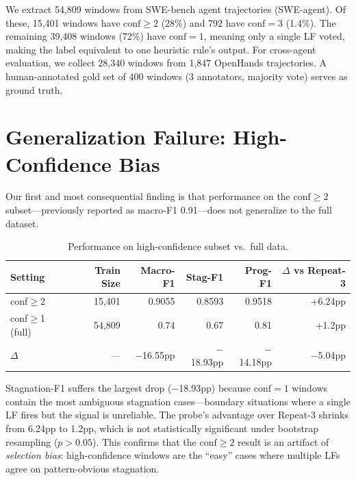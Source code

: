 \documentclass[11pt]{article}
\begin{document}
We extract 54,809 windows from SWE-bench agent trajectories (SWE-agent).
Of these, 15,401 windows have $\text{conf}\!\geq\!2$ (28\%) and 792 have $\text{conf}\!=\!3$ (1.4\%).
The remaining 39,408 windows (72\%) have $\text{conf}\!=\!1$, meaning only a single LF voted, making the label equivalent to one heuristic rule's output.
For cross-agent evaluation, we collect 28,340 windows from 1,847 OpenHands trajectories.
A human-annotated gold set of 400 windows (3 annotators, majority vote) serves as ground truth.

\section{Generalization Failure: High-Confidence Bias}
\label{sec:generalization}

Our first and most consequential finding is that performance on the $\text{conf}\!\geq\!2$ subset---previously reported as macro-F1 0.91---does not generalize to the full dataset.

\begin{table}[h]
\centering
\caption{Performance on high-confidence subset vs.\ full data.}
\label{tab:conf_generalization}
\begin{tabular}{lrrrrr}
\toprule
\textbf{Setting} & \textbf{Train Size} & \textbf{Macro-F1} & \textbf{Stag-F1} & \textbf{Prog-F1} & \textbf{$\Delta$ vs Repeat-3} \\
\midrule
conf$\geq$2 & 15,401 & 0.9055 & 0.8593 & 0.9518 & +6.24pp \\
conf$\geq$1 (full) & 54,809 & 0.74 & 0.67 & 0.81 & +1.2pp \\
\midrule
$\Delta$ & --- & $-$16.55pp & $-$18.93pp & $-$14.18pp & $-$5.04pp \\
\bottomrule
\end{tabular}
\end{table}

Stagnation-F1 suffers the largest drop ($-$18.93pp) because $\text{conf}\!=\!1$ windows contain the most ambiguous stagnation cases---boundary situations where a single LF fires but the signal is unreliable.
The probe's advantage over Repeat-3 shrinks from 6.24pp to 1.2pp, which is not statistically significant under bootstrap resampling ($p > 0.05$).
This confirms that the $\text{conf}\!\geq\!2$ result is an artifact of \emph{selection bias}: high-confidence windows are the ``easy'' cases where multiple LFs agree on pattern-obvious stagnation.
\end{document}
